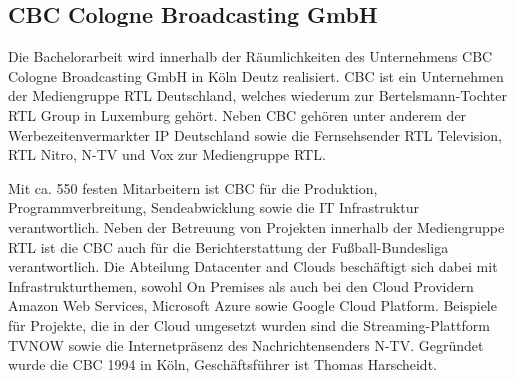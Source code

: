 \subsection{CBC Cologne Broadcasting GmbH}

Die Bachelorarbeit wird innerhalb der Räumlichkeiten des Unternehmens CBC Cologne Broadcasting GmbH in Köln Deutz realisiert.
CBC ist ein Unternehmen der Mediengruppe RTL Deutschland, welches wiederum zur Bertelsmann-Tochter RTL Group in Luxemburg gehört.
Neben CBC gehören unter anderem der Werbezeitenvermarkter IP Deutschland sowie die Fernsehsender RTL Television, RTL Nitro, N-TV und Vox zur Mediengruppe RTL.


Mit ca. 550 festen Mitarbeitern ist CBC für die Produktion, Programmverbreitung, Sendeabwicklung sowie die IT Infrastruktur verantwortlich.
Neben der Betreuung von Projekten innerhalb der Mediengruppe RTL ist die CBC auch für die Berichterstattung der Fußball-Bundesliga verantwortlich.
Die Abteilung Datacenter and Clouds beschäftigt sich dabei mit Infrastrukturthemen, sowohl On Premises als auch bei den Cloud Providern Amazon Web Services, Microsoft Azure sowie Google Cloud Platform.
Beispiele für Projekte, die in der Cloud umgesetzt wurden sind die Streaming-Plattform TVNOW sowie die Internetpräsenz des Nachrichtensenders N-TV.
Gegründet wurde die CBC 1994 in Köln, Geschäftsführer ist Thomas Harscheidt.

